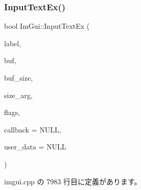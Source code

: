 \subsubsection{\texorpdfstring{Input\+Text\+Ex()}{InputTextEx()}}
{\footnotesize\ttfamily bool Im\+Gui\+::\+Input\+Text\+Ex (\begin{DoxyParamCaption}\item[{const char $\ast$}]{label,  }\item[{char $\ast$}]{buf,  }\item[{int}]{buf\+\_\+size,  }\item[{const \mbox{\hyperlink{struct_im_vec2}{Im\+Vec2}} \&}]{size\+\_\+arg,  }\item[{\mbox{\hyperlink{imgui_8h_a7d2c6153a6b9b5d3178ce82434ac9fb8}{Im\+Gui\+Input\+Text\+Flags}}}]{flags,  }\item[{\mbox{\hyperlink{imgui_8h_ae9254e6ad76a9bc7abc20929e07b29c5}{Im\+Gui\+Text\+Edit\+Callback}}}]{callback = {\ttfamily NULL},  }\item[{void $\ast$}]{user\+\_\+data = {\ttfamily NULL} }\end{DoxyParamCaption})}



 imgui.\+cpp の 7983 行目に定義があります。

